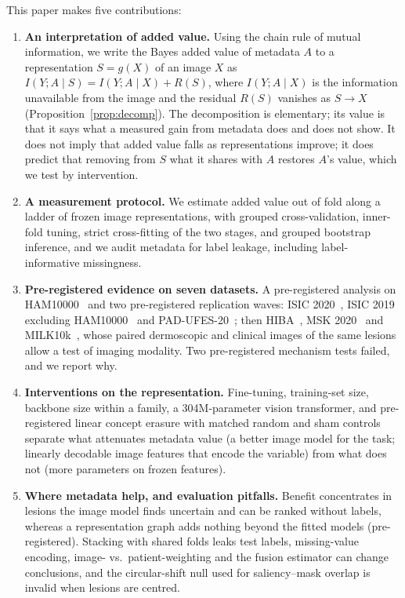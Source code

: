 \documentclass[conference]{IEEEtran}
\begin{document}
This paper makes five contributions:
\begin{enumerate}
\item \textbf{An interpretation of added value.} Using the chain rule of mutual information, we write the Bayes added value of metadata $A$ to a representation $S=g(X)$ of an image $X$ as $I(Y;A\mid S)=I(Y;A\mid X)+R(S)$, where $I(Y;A\mid X)$ is the information unavailable from the image and the residual $R(S)$ vanishes as $S\to X$ (Proposition~\ref{prop:decomp}). The decomposition is elementary; its value is that it says what a measured gain from metadata does and does not show. It does not imply that added value falls as representations improve; it does predict that removing from $S$ what it shares with $A$ restores $A$'s value, which we test by intervention.
\item \textbf{A measurement protocol.} We estimate added value out of fold along a ladder of frozen image representations, with grouped cross-validation, inner-fold tuning, strict cross-fitting of the two stages, and grouped bootstrap inference, and we audit metadata for label leakage, including label-informative missingness.
\item \textbf{Pre-registered evidence on seven datasets.} A pre-registered analysis on HAM10000~\cite{tschandl2018ham} and two pre-registered replication waves: ISIC 2020~\cite{rotemberg2021isic}, ISIC 2019 excluding HAM10000~\cite{combalia2019bcn} and PAD-UFES-20~\cite{pacheco2020pad}; then HIBA~\cite{riccilara2023hiba}, MSK 2020~\cite{msk2020collection} and MILK10k~\cite{tschandl2026milk}, whose paired dermoscopic and clinical images of the same lesions allow a test of imaging modality. Two pre-registered mechanism tests failed, and we report why.
\item \textbf{Interventions on the representation.} Fine-tuning, training-set size, backbone size within a family, a 304M-parameter vision transformer, and pre-registered linear concept erasure with matched random and sham controls separate what attenuates metadata value (a better image model for the task; linearly decodable image features that encode the variable) from what does not (more parameters on frozen features).
\item \textbf{Where metadata help, and evaluation pitfalls.} Benefit concentrates in lesions the image model finds uncertain and can be ranked without labels, whereas a representation graph adds nothing beyond the fitted models (pre-registered). Stacking with shared folds leaks test labels, missing-value encoding, image- vs.\ patient-weighting and the fusion estimator can change conclusions, and the circular-shift null used for saliency--mask overlap is invalid when lesions are centred.
\end{enumerate}
\end{document}
